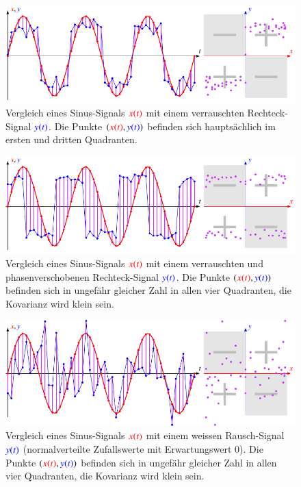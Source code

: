 \begin{figure}
\centering
\includegraphics[width=\hsize]{chapters/1-geometrie/images/sinrect.pdf}
\caption{Vergleich eines Sinus-Signals $\color{red}x(t)$ mit einem
verrauschten Rechteck-Signal $\color{blue}y(t)$.
Die Punkte $({\color{red}x(t)},{\color{blue}y(t)})$ befinden sich
hauptsächlich im ersten und dritten Quadranten.
\label{geometrie:kovarianz:sinrect:image}}
\end{figure}
\begin{figure}
\centering
\includegraphics[width=\hsize]{chapters/1-geometrie/images/cosrect.pdf}
\caption{Vergleich eines Sinus-Signals $\color{red}x(t)$ mit einem
verrauschten und phasenverschobenen Rechteck-Signal $\color{blue}y(t)$.
Die Punkte $({\color{red}x(t)},{\color{blue}y(t)})$ befinden sich
in ungefähr gleicher Zahl in allen vier Quadranten, die Kovarianz
wird klein sein.
\label{geometrie:kovarianz:cosrect:image}}
\end{figure}
\begin{figure}
\centering
\includegraphics[width=\hsize]{chapters/1-geometrie/images/sinrand.pdf}
\caption{Vergleich eines Sinus-Signals $\color{red}x(t)$ mit einem
weissen Rausch-Signal $\color{blue}y(t)$ (normalverteilte Zufallswerte
mit Erwartungswert $0$).
Die Punkte $({\color{red}x(t)},{\color{blue}y(t)})$ befinden sich
in ungefähr gleicher Zahl in allen vier Quadranten, die Kovarianz
wird klein sein.
\label{geometrie:kovarianz:sinrand:image}}
\end{figure}


